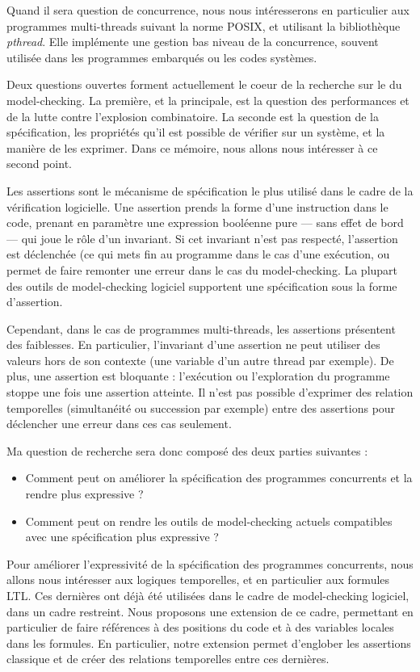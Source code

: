 Quand il sera question de concurrence, nous nous intéresserons en
particulier aux programmes multi-threads suivant la norme POSIX, et
utilisant la bibliothèque \emph{pthread}. Elle implémente une gestion
bas niveau de la concurrence, souvent utilisée dans les programmes
embarqués ou les codes systèmes.

Deux questions ouvertes forment actuellement le coeur de la recherche
sur le du model-checking. La première, et la principale, est la question
des performances et de la lutte contre l'explosion combinatoire. La
seconde est la question de la spécification, les propriétés qu'il est
possible de vérifier sur un système, et la manière de les exprimer. Dans
ce mémoire, nous allons nous intéresser à ce second point.

Les assertions sont le mécanisme de spécification le plus utilisé dans
le cadre de la vérification logicielle. Une assertion prends la forme
d'une instruction dans le code, prenant en paramètre une expression
booléenne pure --- sans effet de bord --- qui joue le rôle d'un
invariant. Si cet invariant n'est pas respecté, l'assertion est
déclenchée (ce qui mets fin au programme dans le cas d'une exécution, ou
permet de faire remonter une erreur dans le cas du model-checking. La
plupart des outils de model-checking logiciel supportent une
spécification sous la forme d'assertion.

Cependant, dans le cas de programmes multi-threads, les assertions
présentent des faiblesses. En particulier, l'invariant d'une assertion
ne peut utiliser des valeurs hors de son contexte (une variable d'un
autre thread par exemple). De plus, une assertion est bloquante :
l'exécution ou l'exploration du programme stoppe une fois une assertion
atteinte. Il n'est pas possible d'exprimer des relation temporelles
(simultanéité ou succession par exemple) entre des assertions pour
déclencher une erreur dans ces cas seulement.

Ma question de recherche sera donc composé des deux parties suivantes :

\begin{itemize}
\item
  Comment peut on améliorer la spécification des programmes concurrents
  et la rendre plus expressive ?
\item
  Comment peut on rendre les outils de model-checking actuels
  compatibles avec une spécification plus expressive ?
\end{itemize}

Pour améliorer l'expressivité de la spécification des programmes
concurrents, nous allons nous intéresser aux logiques temporelles, et en
particulier aux formules LTL. Ces dernières ont déjà été utilisées dans
le cadre de model-checking logiciel, dans un cadre restreint. Nous
proposons une extension de ce cadre, permettant en particulier de faire
références à des positions du code et à des variables locales dans les
formules. En particulier, notre extension permet d'englober les
assertions classique et de créer des relations temporelles entre ces
dernières.

